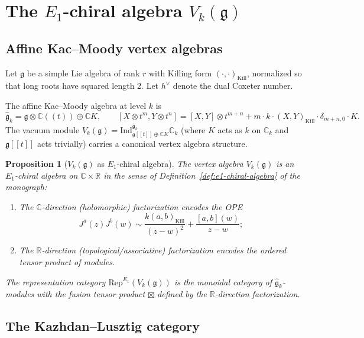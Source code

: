 \documentclass[11pt]{article}
\newtheorem{proposition}[theorem]{Proposition}
\theoremstyle{definition}
\theoremstyle{remark}
\newcommand{\Rep}{\mathrm{Rep}}
\newcommand{\Ind}{\mathrm{Ind}}
\newcommand{\frakg}{\mathfrak{g}}
\newcommand{\hv}{h^\vee}
\begin{document}
\section{The $E_1$-chiral algebra $V_k(\frakg)$}
\label{sec:e1-vk}

\subsection{Affine Kac--Moody vertex algebras}
\label{subsec:affine-km}

Let $\frakg$ be a simple Lie algebra of rank $r$ with Killing form
$(\cdot, \cdot)_{\mathrm{Kill}}$, normalized so that long roots have
squared length 2. Let $\hv$ denote the dual Coxeter number.

The affine Kac--Moody algebra at level $k$ is
\[
 \hat{\frakg}_k = \frakg \otimes \mathbb{C}((t)) \oplus \mathbb{C} K,
 \qquad
 [X \otimes t^m, Y \otimes t^n] = [X,Y] \otimes t^{m+n}
 + m \cdot k \cdot (X, Y)_{\mathrm{Kill}} \cdot \delta_{m+n,0} \cdot K.
\]
The vacuum module $V_k(\frakg) = \Ind_{\frakg[[t]] \oplus \mathbb{C} K}^{\hat{\frakg}_k} \mathbb{C}_k$
(where $K$ acts as $k$ on $\mathbb{C}_k$ and $\frakg[[t]]$ acts trivially)
carries a canonical vertex algebra structure.

\begin{proposition}[$V_k(\frakg)$ as $E_1$-chiral algebra]
\label{prop:vk-e1}
The vertex algebra $V_k(\frakg)$ is an $E_1$-chiral algebra on
$\mathbb{C} \times \mathbb{R}$ in the sense of Definition~\ref{def:e1-chiral-algebra}
of the monograph:
\begin{enumerate}[label=(\roman*)]
 \item The $\mathbb{C}$-direction (holomorphic) factorization encodes the
 OPE
 \[
 J^a(z) J^b(w) \sim \frac{k (a, b)_{\mathrm{Kill}}}{(z-w)^2}
 + \frac{[a,b](w)}{z - w};
 \]
 \item The $\mathbb{R}$-direction (topological/associative) factorization
 encodes the ordered tensor product of modules.
\end{enumerate}
The representation category $\Rep^{E_1}(V_k(\frakg))$ is the monoidal
category of $\hat{\frakg}_k$-modules with the \emph{fusion tensor product}
$\boxtimes$ defined by the $\mathbb{R}$-direction factorization.
\end{proposition}

\subsection{The Kazhdan--Lusztig category}
\label{subsec:kl-category}
\end{document}
